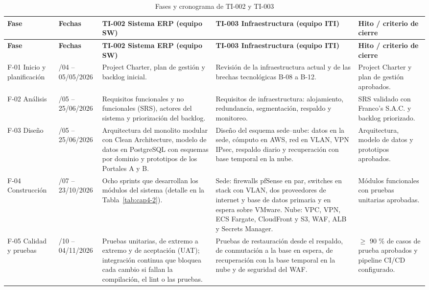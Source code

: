 {\small
\renewcommand{\arraystretch}{1.3}
\begin{longtable}{|>{\raggedright\arraybackslash}p{1.71cm}|>{\raggedright\arraybackslash}p{1.46cm}|>{\raggedright\arraybackslash}p{3.81cm}|>{\raggedright\arraybackslash}p{3.81cm}|>{\raggedright\arraybackslash}p{3.81cm}|}
\caption{Fases y cronograma de TI-002 y TI-003}\label{tab:cap4-1}\\
\hline
\textbf{Fase} & \textbf{Fechas} & \textbf{TI-002 Sistema ERP (equipo SW)} & \textbf{TI-003 Infraestructura (equipo ITI)} & \textbf{Hito / criterio de cierre} \\
\hline
\endfirsthead
\hline
\textbf{Fase} & \textbf{Fechas} & \textbf{TI-002 Sistema ERP (equipo SW)} & \textbf{TI-003 Infraestructura (equipo ITI)} & \textbf{Hito / criterio de cierre} \\
\hline
\endhead
F-01 Inicio y planificación & 06/04 – 05/05/2026 & Project Charter, plan de gestión y backlog inicial. & Revisión de la infraestructura actual y de las brechas tecnológicas B-08 a B-12. & Project Charter y plan de gestión aprobados. \\
\hline
F-02 Análisis & 06/05 – 25/06/2026 & Requisitos funcionales y no funcionales (SRS), actores del sistema y priorización del backlog. & Requisitos de infraestructura: alojamiento, redundancia, segmentación, respaldo y monitoreo. & SRS validado con Franco's S.A.C. y backlog priorizado. \\
\hline
F-03 Diseño & 25/05 – 25/06/2026 & Arquitectura del monolito modular con Clean Architecture, modelo de datos en PostgreSQL con esquemas por dominio y prototipos de los Portales A y B. & Diseño del esquema sede–nube: datos en la sede, cómputo en AWS, red en VLAN, VPN IPsec, respaldo diario y recuperación con base temporal en la nube. & Arquitectura, modelo de datos y prototipos aprobados. \\
\hline
F-04 Construcción & 06/07 – 23/10/2026 & Ocho sprints que desarrollan los módulos del sistema (detalle en la Tabla~\ref{tab:cap4-2}). & Sede: firewalls pfSense en par, switches en stack con VLAN, dos proveedores de internet y base de datos primaria y en espera sobre VMware. Nube: VPC, VPN, ECS Fargate, CloudFront y S3, WAF, ALB y Secrets Manager. & Módulos funcionales con pruebas unitarias aprobadas. \\
\hline
F-05 Calidad y pruebas & 12/10 – 04/11/2026 & Pruebas unitarias, de extremo a extremo y de aceptación (UAT); integración continua que bloquea cada cambio si fallan la compilación, el lint o las pruebas. & Pruebas de restauración desde el respaldo, de conmutación a la base en espera, de recuperación con la base temporal en la nube y de seguridad del WAF. & $\geq$ 90 \% de casos de prueba aprobados y pipeline CI/CD configurado. \\

\end{longtable}}
